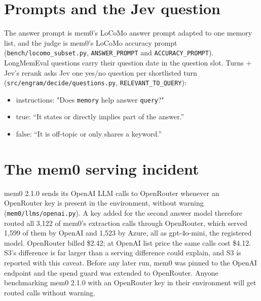 \documentclass[11pt]{article}
\newcommand{\src}[1]{}
\begin{document}
\FloatBarrier
\section{Prompts and the Jev question}\label{app:F}
The answer prompt is mem0's LoCoMo answer prompt adapted to one memory list, and the judge is mem0's LoCoMo accuracy prompt (\texttt{bench/\allowbreak{}locomo\_\allowbreak{}subset.py}, \texttt{ANSWER\_\allowbreak{}PROMPT} and \texttt{ACCURACY\_\allowbreak{}PROMPT}). LongMemEval questions carry their question date in the question slot. Turns + Jev's rerank asks Jev one yes/no question per shortlisted turn (\texttt{src/\allowbreak{}engram/\allowbreak{}decide/\allowbreak{}questions.py}, \texttt{RELEVANT\_\allowbreak{}TO\_\allowbreak{}QUERY}):

\begin{itemize}
\item instructions: "Does \texttt{memory} help answer \texttt{query}?"
\item true: ``It states or directly implies part of the answer.''
\item false: ``It is off-topic or only shares a keyword.''
\end{itemize}
\FloatBarrier
\section{The mem0 serving incident}\label{app:G}
mem0 2.1.0 sends its OpenAI LLM calls to OpenRouter whenever an OpenRouter key is present in the environment, without warning (\texttt{mem0/\allowbreak{}llms/\allowbreak{}openai.py}). A key added for the second answer model therefore routed all 3,122\src{docs/V3\_PLAN.md §12 (mem0 via OpenRouter, resolved): provider fields of the cached responses} of mem0's extraction calls through OpenRouter, which served 1,599\src{docs/V3\_PLAN.md §12 (mem0 via OpenRouter, resolved)} of them by OpenAI and 1,523\src{docs/V3\_PLAN.md §12 (mem0 via OpenRouter, resolved)} by Azure, all as gpt-4o-mini, the registered model. OpenRouter billed \$2.42\src{bench/results/v3/spend.jsonl\#correction/openrouter\_outside\_cap}; at OpenAI list price the same calls cost \$4.12\src{bench/results/v3/spend.jsonl\#correction/spend/openai (negated)}. S3's difference is far larger than a serving difference could explain, and S3 is reported with this caveat. Before any later run, mem0 was pinned to the OpenAI endpoint and the spend guard was extended to OpenRouter. Anyone benchmarking mem0 2.1.0 with an OpenRouter key in their environment will get routed calls without warning.
\end{document}

